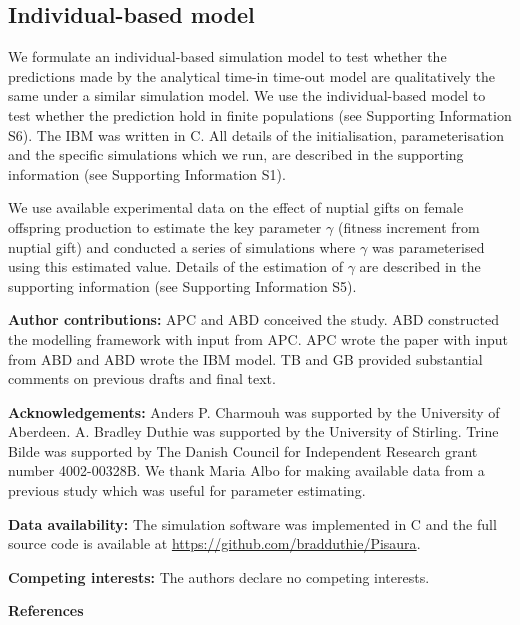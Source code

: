 \documentclass[
]{article}
\begin{document}
\hypertarget{individual-based-model}{%
\subsection{Individual-based model}\label{individual-based-model}}

We formulate an individual-based simulation model to test whether the
predictions made by the analytical time-in time-out model are
qualitatively the same under a similar simulation model. We use the
individual-based model to test whether the prediction hold in finite
populations (see Supporting Information S6). The IBM was written in C.
All details of the initialisation, parameterisation and the specific
simulations which we run, are described in the supporting information
(see Supporting Information S1).

We use available experimental data on the effect of nuptial gifts on
female offspring production to estimate the key parameter \(\gamma\)
(fitness increment from nuptial gift) and conducted a series of
simulations where \(\gamma\) was parameterised using this estimated
value. Details of the estimation of \(\gamma\) are described in the
supporting information (see Supporting Information S5).

\textbf{Author contributions:} APC and ABD conceived the study. ABD
constructed the modelling framework with input from APC. APC wrote the
paper with input from ABD and ABD wrote the IBM model. TB and GB
provided substantial comments on previous drafts and final text.

\textbf{Acknowledgements:} Anders P. Charmouh was supported by the
University of Aberdeen. A. Bradley Duthie was supported by the
University of Stirling. Trine Bilde was supported by The Danish Council
for Independent Research grant number 4002-00328B. We thank Maria Albo
for making available data from a previous study which was useful for
parameter estimating.

\textbf{Data availability:} The simulation software was implemented in C
and the full source code is available at
\url{https://github.com/bradduthie/Pisaura}.

\textbf{Competing interests:} The authors declare no competing
interests.

\textbf{References}
\end{document}
